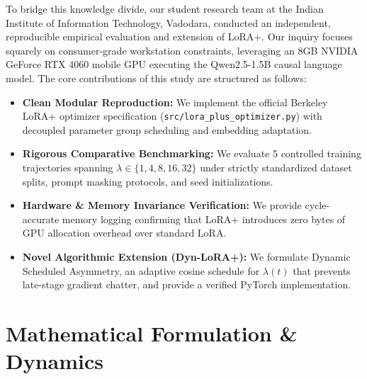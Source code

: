 \documentclass[conference]{IEEEtran}
\begin{document}
To bridge this knowledge divide, our student research team at the Indian Institute of Information Technology, Vadodara, conducted an independent, reproducible empirical evaluation and extension of LoRA+. Our inquiry focuses squarely on consumer-grade workstation constraints, leveraging an 8GB NVIDIA GeForce RTX 4060 mobile GPU executing the Qwen2.5-1.5B causal language model. The core contributions of this study are structured as follows:
\begin{itemize}
    \item \textbf{Clean Modular Reproduction:} We implement the official Berkeley LoRA+ optimizer specification (\texttt{src/lora\_plus\_optimizer.py}) with decoupled parameter group scheduling and embedding adaptation.
    \item \textbf{Rigorous Comparative Benchmarking:} We evaluate 5 controlled training trajectories spanning $\lambda \in \{1, 4, 8, 16, 32\}$ under strictly standardized dataset splits, prompt masking protocols, and seed initializations.
    \item \textbf{Hardware \& Memory Invariance Verification:} We provide cycle-accurate memory logging confirming that LoRA+ introduces zero bytes of GPU allocation overhead over standard LoRA.
    \item \textbf{Novel Algorithmic Extension (Dyn-LoRA+):} We formulate Dynamic Scheduled Asymmetry, an adaptive cosine schedule for $\lambda(t)$ that prevents late-stage gradient chatter, and provide a verified PyTorch implementation.
\end{itemize}

\section{Mathematical Formulation \& Dynamics}
\end{document}
